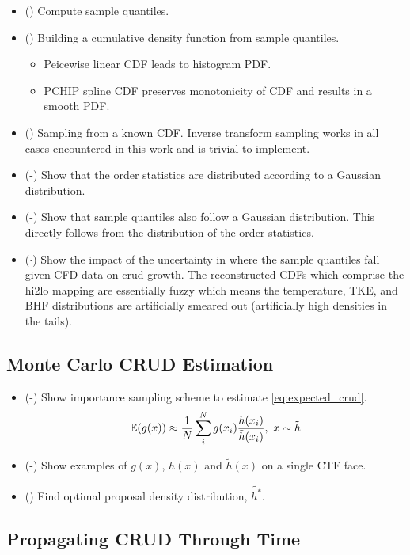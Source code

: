 \begin{itemize}
	\item (\checkmark) Compute sample quantiles.
	\item (\checkmark) Building a cumulative density function from sample quantiles.  
	\begin{itemize}
	   \item Peicewise linear CDF leads to histogram PDF.
	   \item PCHIP spline CDF preserves monotonicity of CDF and results in a smooth PDF. \cite{Fritsch80}
	\end{itemize}
	\item (\checkmark) Sampling from a known CDF.  Inverse transform sampling works in all cases encountered in this work and is trivial to implement.
	\item (\checkmark-) Show that the order statistics are distributed according to a Gaussian distribution.  
	\item (\checkmark-) Show that  sample quantiles also follow a Gaussian distribution.  This directly follows from the distribution of the order statistics.
	\item ($\cdot$) Show the impact of the uncertainty in where the sample quantiles fall given CFD data on crud growth.  The reconstructed CDFs which comprise the hi2lo mapping are essentially fuzzy which means the temperature, TKE, and BHF distributions are artificially smeared out (artificially high densities in the tails).
\end{itemize}

\subsection{Monte Carlo CRUD Estimation}

\begin{itemize}
	\item (\checkmark-) Show importance sampling scheme to estimate \ref{eq:expected_crud}.
	\begin{equation}
	\operatorname*{\mathbb{E}}(g(x)) \approx \frac{1}{N} \sum_i^N g(x_i) \frac{h(x_i)}{\tilde h(x_i)}, \ x \sim \tilde{h}
	\end{equation}
	\item (\checkmark-) Show examples of $g(x)$, $h(x)$ and $\tilde h(x)$ on a single CTF face.
	\item (\xmark) \sout{Find optimal proposal density distribution, $\tilde{h^*}$.}
\end{itemize}


\subsection{Propagating CRUD Through Time}
